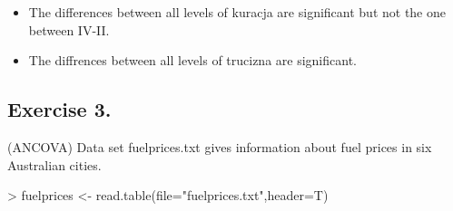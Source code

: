 \documentclass[a4paper]{article}
\begin{document}
\begin{itemize}
\begin{Schunk}
\end{Schunk}
\begin{itemize}
  \item The differences between all levels of kuracja are significant but not
  the one between IV-II.
  \item The diffrences between all levels of trucizna are significant.
\end{itemize}
\end{itemize}

\subsection{Exercise 3.}  (ANCOVA) Data set fuelprices.txt  gives information
about fuel prices in six Australian cities.
\begin{Schunk}
\begin{Sinput}
> fuelprices <- read.table(file="fuelprices.txt",header=T)	
\end{Sinput}
\end{Schunk}
\end{document}
